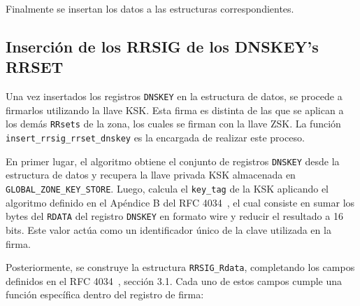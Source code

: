 Finalmente se insertan los datos a las estructuras correspondientes.

\subsection{Inserción de los RRSIG de los DNSKEY's RRSET}

Una vez insertados los registros \texttt{DNSKEY} en la estructura de datos, se procede a firmarlos utilizando la llave KSK. Esta firma es distinta de las que se aplican a los demás 
\texttt{RRsets} de la zona, los cuales se firman con la llave ZSK. La función \texttt{insert\_rrsig\_rrset\_dnskey} es la encargada de realizar este proceso.

En primer lugar, el algoritmo obtiene el conjunto de registros \texttt{DNSKEY} desde la estructura de datos y recupera la llave privada KSK almacenada en \texttt{GLOBAL\_ZONE\_KEY\_STORE}.
Luego, calcula el \texttt{key\_tag} de la KSK aplicando el algoritmo definido en el Apéndice B del RFC 4034~\cite{RFC4034}, el cual consiste en sumar los bytes del \texttt{RDATA} del registro 
\texttt{DNSKEY} en formato wire y reducir el resultado a 16 bits. Este valor actúa como un identificador único de la clave utilizada en la firma.

Posteriormente, se construye la estructura \texttt{RRSIG\_Rdata}, completando los campos definidos en el RFC 4034~\cite{RFC4034}, sección 3.1. 
Cada uno de estos campos cumple una función específica dentro del registro de firma:

